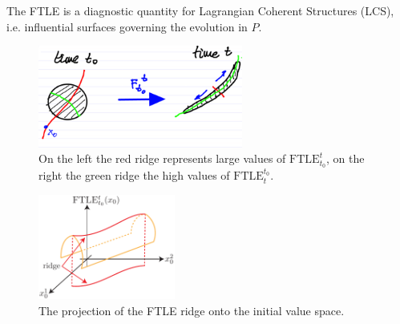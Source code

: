 The FTLE is a diagnostic quantity for Lagrangian Coherent Structures (LCS), i.e. influential surfaces governing the evolution in $P$.
\begin{figure}[h!]
	\centering
	\includegraphics[width=0.6\textwidth]{figures/ch1/9deformation.png}
	\caption{On the left the red ridge represents large values of $ \textrm{FTLE} _{t_0}^{t}$, on the right the green ridge the high values of $ \textrm{FTLE} _{t}^{t_0}$.}
	\label{fig:FTLE_ridges}
\end{figure}
\begin{figure}[h!]
	\centering
	\includegraphics[width=0.4\textwidth]{figures/ch1/10ridge_projection}
	\caption{The projection of the FTLE ridge onto the initial value space.}
	\label{fig:FTLE_surface}
\end{figure}

